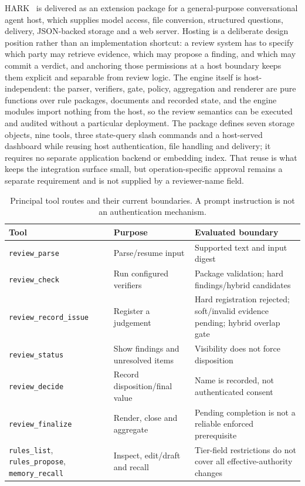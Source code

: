 \documentclass[computers,article,submit,moreauthors]{Definitions/mdpi}
\begin{document}
HARK~\cite{artifact} is delivered as an extension package for a general-purpose conversational agent host, which supplies model access, file conversion, structured questions, delivery, JSON-backed storage and a web server. Hosting is a deliberate design position rather than an implementation shortcut: a review system has to specify which party may retrieve evidence, which may propose a finding, and which may commit a verdict, and anchoring those permissions at a host boundary keeps them explicit and separable from review logic. The engine itself is host-independent: the parser, verifiers, gate, policy, aggregation and renderer are pure functions over rule packages, documents and recorded state, and the engine modules import nothing from the host, so the review semantics can be executed and audited without a particular deployment. The package defines seven storage objects, nine tools, three state-query slash commands and a host-served dashboard while reusing host authentication, file handling and delivery; it requires no separate application backend or embedding index. That reuse is what keeps the integration surface small, but operation-specific approval remains a separate requirement and is not supplied by a reviewer-name field.

\begin{table}[!ht]
\caption{Principal tool routes and their current boundaries. A prompt instruction is not an authentication mechanism.}
\label{tab:tools}
\centering\footnotesize
\begin{tabularx}{\textwidth}{@{}p{3.4cm}XX@{}}
\toprule
Tool & Purpose & Evaluated boundary \\
\midrule
\texttt{review\_parse} & Parse/resume input & Supported text and input digest \\
\texttt{review\_check} & Run configured verifiers & Package validation; hard findings/hybrid candidates \\
\texttt{review\_record\_issue} & Register a judgement & Hard registration rejected; soft/invalid evidence pending; hybrid overlap gate \\
\texttt{review\_status} & Show findings and unresolved items & Visibility does not force disposition \\
\texttt{review\_decide} & Record disposition/final value & Name is recorded, not authenticated consent \\
\texttt{review\_finalize} & Render, close and aggregate & Pending completion is not a reliable enforced prerequisite \\
\texttt{rules\_list}, \texttt{rules\_propose}, \texttt{memory\_recall} & Inspect, edit/draft and recall & Tier-field restrictions do not cover all effective-authority changes \\
\bottomrule
\end{tabularx}
\end{table}
\end{document}
